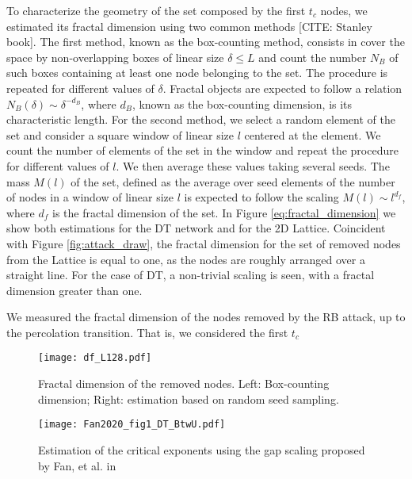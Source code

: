 \documentclass{article}
\begin{document}
To characterize the geometry of the set composed by the first $t_c$ nodes, we estimated its fractal dimension using two common methods [CITE: Stanley book]. The first method, known as the box-counting method, consists in cover the space by non-overlapping boxes of linear size $\delta \leq L$ and count the number $N_B$  of such boxes containing at least one node belonging to the set. The procedure is repeated for different values of $\delta$. Fractal objects are expected to follow a relation $N_B(\delta) \sim \delta^{-d_B}$, where $d_B$, known as the box-counting dimension, is its characteristic length. For the second method, we select a random element of the set and consider a square window of linear size $l$ centered at the element. We count the number of elements of the set in the window and repeat the procedure for different values of $l$. We then average these values taking several seeds. The mass $M(l)$ of the set, defined as the average over seed elements of the number of nodes in a window of linear size $l$ is expected to follow the scaling $M(l)\sim l^{d_f}$, where $d_f$ is the fractal dimension of the set. In Figure \ref{eq:fractal_dimension} we show both estimations for the DT network and for the 2D Lattice. Coincident with Figure \ref{fig:attack_draw}, the fractal dimension for the set of removed nodes from the Lattice is equal to one, as the nodes are roughly arranged over a straight line. For the case of DT, a non-trivial scaling is seen, with a fractal dimension greater than one.

We measured the fractal dimension of the nodes removed by the RB attack, up to the percolation transition. That is, we considered the first $t_c$ 

\begin{figure}
\centering
\texttt{[image: df\_L128.pdf]}
\caption{\label{fig:fractal_dimension} Fractal dimension of the removed nodes. Left: Box-counting dimension; Right: estimation based on random seed sampling.}
\end{figure}

\begin{figure}
\centering
\texttt{[image: Fan2020\_fig1\_DT\_BtwU.pdf]}
\caption{\label{fig:fractal_dimension} Estimation of the critical exponents using the gap scaling proposed by Fan, et al. in \cite{Fan2020} }
\end{figure}




\end{document}
